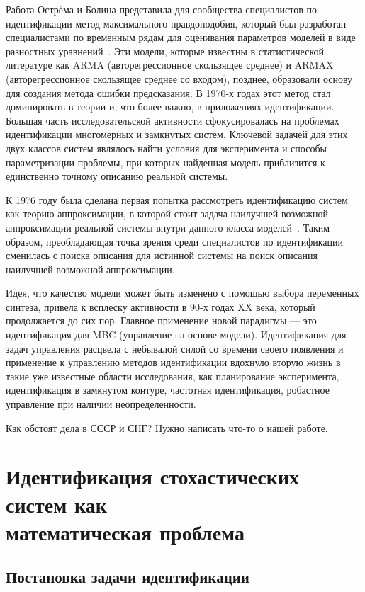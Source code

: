 Работа Острёма и Болина представила для сообщества специалистов по идентификации метод
максимального правдоподобия, который был разработан специалистами по временным рядам для
оценивания параметров моделей в виде разностных уравнений~\cite{koopmans_1950}.
Эти модели, которые известны в статистической литературе как ARMA (авторегрессионное скользящее среднее) и
ARMAX (авторегрессионное скользящее среднее со входом), позднее,
образовали основу для создания метода ошибки предсказания.
В 1970-х годах этот метод стал доминировать в теории и, что более важно, в приложениях идентификации.
Большая часть исследовательской активности сфокусировалась на проблемах идентификации многомерных и
замкнутых систем.
Ключевой задачей для этих двух классов систем являлось найти условия для эксперимента и
способы параметризации проблемы, при которых найденная модель приблизится к единственно точному
описанию реальной системы.

К 1976 году была сделана первая попытка рассмотреть идентификацию систем как теорию аппроксимации,
в которой стоит задача наилучшей возможной аппроксимации реальной системы внутри данного класса
моделей~\cite{ljung_1976, anderson_1978, ljung_1979}.
Таким образом, преобладающая точка зрения среди специалистов по идентификации сменилась с
поиска описания для истинной системы на поиск описания наилучшей возможной аппроксимации.

Идея, что качество модели может быть изменено с помощью выбора переменных синтеза,
привела к всплеску активности в 90-х годах XX века, который продолжается до сих пор.
Главное применение новой парадигмы --- это идентификация для MBC (управление на основе модели).
Идентификация для задач управления расцвела с небывалой силой со времени своего появления и
применение к управлению методов идентификации вдохнуло вторую жизнь в такие уже
известные области исследования, как планирование эксперимента, идентификация в замкнутом контуре,
частотная идентификация, робастное управление при наличии неопределенности.

{\color{red}
  Как обстоят дела в СССР и СНГ?
  Нужно написать что-то о нашей работе.
}

\section[Идентификация стохастических систем как математическая проблема]{%
  Идентификация стохастических систем как \\
  математическая проблема}

\subsection{Постановка задачи идентификации}

